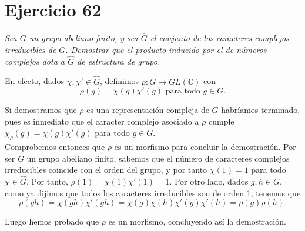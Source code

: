 \section{Ejercicio 62}%
\label{sec:ejercicio_62}

\textit{Sea \(G\) un grupo abeliano finito, y sea \(\widehat{G}\) el conjunto de los caracteres complejos irreducibles de \(G\). Demostrar que el producto inducido por el de números complejos dota a \(\widehat{G}\) de estructura de grupo.}

En efecto, dados \(\chi, \chi' \in \widehat{G}\), definimos \(\rho: G \to GL(\mathbb{C})\) con
\[
\rho(g) = \chi(g) \chi'(g) \text{ para todo } g \in G
.\]

Si demostramos que \(\rho\) es una representación compleja de \(G\) habríamos terminado, pues es inmediato que el caracter complejo asociado a \(\rho\) cumple \(\chi_{\rho}(g) = \chi(g) \chi'(g)\) para todo \(g \in G\). \\

Comprobemos entonces que \(\rho\) es un morfismo para concluir la demostración. Por ser \(G\) un grupo abeliano finito, sabemos que el número de caracteres complejos irreducibles coincide con el orden del grupo, y por tanto \(\chi(1) = 1\) para todo  \(\chi \in \widehat{G}\). Por tanto, \(\rho(1) = \chi(1)\chi'(1) = 1\). Por otro lado, dados \(g, h \in G\), como ya dijimos que todos los caracteres irreducibles son de orden 1, tenemos que
\[
\rho(gh) = \chi(gh) \chi'(gh) = \chi(g)\chi(h)\chi'(g)\chi'(h) = \rho(g)\rho(h)
.\]

Luego hemos probado que \(\rho\) es un morfismo, concluyendo así la demostración.
